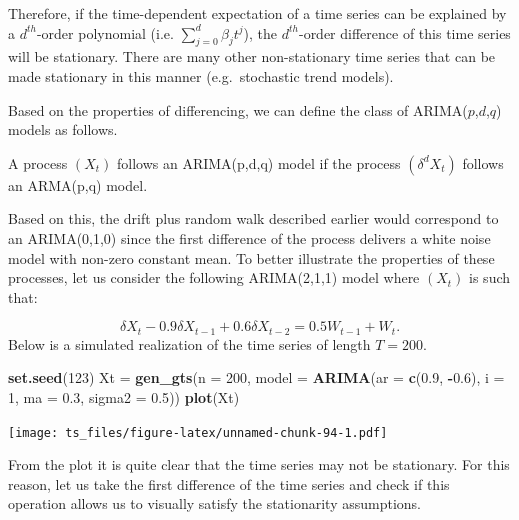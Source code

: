 \documentclass[]{book}
\newenvironment{Shaded}{\begin{snugshade}}{\end{snugshade}}
\newcommand{\KeywordTok}[1]{\textcolor[rgb]{0.13,0.29,0.53}{\textbf{#1}}}
\newcommand{\DataTypeTok}[1]{\textcolor[rgb]{0.13,0.29,0.53}{#1}}
\newcommand{\DecValTok}[1]{\textcolor[rgb]{0.00,0.00,0.81}{#1}}
\newcommand{\FloatTok}[1]{\textcolor[rgb]{0.00,0.00,0.81}{#1}}
\newcommand{\StringTok}[1]{\textcolor[rgb]{0.31,0.60,0.02}{#1}}
\newcommand{\OperatorTok}[1]{\textcolor[rgb]{0.81,0.36,0.00}{\textbf{#1}}}
\newcommand{\NormalTok}[1]{#1}
\theoremstyle{definition}
\theoremstyle{definition}
\theoremstyle{definition}
\theoremstyle{remark}
\let\BeginKnitrBlock\begin \let\EndKnitrBlock\end
\begin{document}
Therefore, if the time-dependent expectation of a time series can be
explained by a \(d^{th}\)-order polynomial (i.e.
\(\sum_{j=0}^d \beta_j t^j\)), the \(d^{th}\)-order difference of this
time series will be stationary. There are many other non-stationary time
series that can be made stationary in this manner (e.g.~stochastic trend
models).

Based on the properties of differencing, we can define the class of
ARIMA(\(p\),\(d\),\(q\)) models as follows.

\BeginKnitrBlock{definition}[ARIMA(p,d,q) Models]
\protect\hypertarget{def:unnamed-chunk-93}{}{\label{def:unnamed-chunk-93}
{} }A process \((X_t)\) follows an
ARIMA(p,d,q) model if the process \((\delta^d X_t)\) follows an
ARMA(p,q) model.
\EndKnitrBlock{definition}

Based on this, the drift plus random walk described earlier would
correspond to an ARIMA(0,1,0) since the first difference of the process
delivers a white noise model with non-zero constant mean. To better
illustrate the properties of these processes, let us consider the
following ARIMA(2,1,1) model where \((X_t)\) is such that:

\[\delta X_t - 0.9 \delta X_{t-1} + 0.6 \delta X_{t-2} = 0.5 W_{t-1} + W_t.\]
Below is a simulated realization of the time series of length
\(T = 200\).

\begin{Shaded}
\begin{Highlighting}[]
\KeywordTok{set.seed}\NormalTok{(}\DecValTok{123}\NormalTok{)}
\NormalTok{Xt =}\StringTok{ }\KeywordTok{gen_gts}\NormalTok{(}\DataTypeTok{n =} \DecValTok{200}\NormalTok{, }\DataTypeTok{model =} \KeywordTok{ARIMA}\NormalTok{(}\DataTypeTok{ar =} \KeywordTok{c}\NormalTok{(}\FloatTok{0.9}\NormalTok{, }\OperatorTok{-}\FloatTok{0.6}\NormalTok{), }\DataTypeTok{i =} \DecValTok{1}\NormalTok{, }\DataTypeTok{ma =} \FloatTok{0.3}\NormalTok{, }\DataTypeTok{sigma2 =} \FloatTok{0.5}\NormalTok{))}
\KeywordTok{plot}\NormalTok{(Xt)}
\end{Highlighting}
\end{Shaded}

\texttt{[image: ts\_files/figure-latex/unnamed-chunk-94-1.pdf]}

From the plot it is quite clear that the time series may not be
stationary. For this reason, let us take the first difference of the
time series and check if this operation allows us to visually satisfy
the stationarity assumptions.
\end{document}
